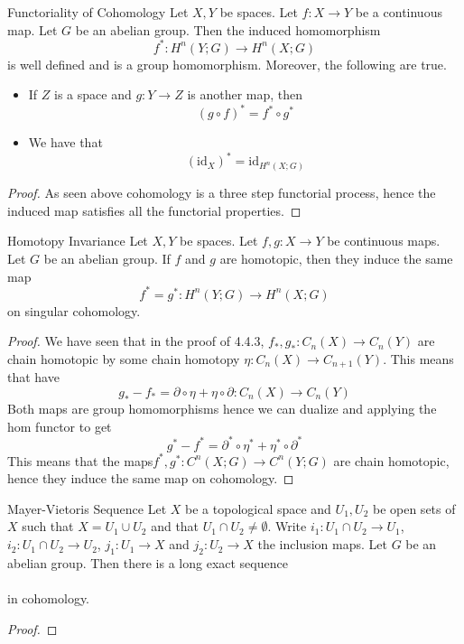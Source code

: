 \documentclass[a4paper]{article}
\begin{document}
\begin{thm}{Functoriality of Cohomology}{} Let $X,Y$ be spaces. Let $f:X\to Y$ be a continuous map. Let $G$ be an abelian group. Then the induced homomorphism $$f^\ast:H^n(Y;G)\to H^n(X;G)$$ is well defined and is a group homomorphism. Moreover, the following are true. 
\begin{itemize}
\item If $Z$ is a space and $g:Y\to Z$ is another map, then $$(g\circ f)^\ast=f^\ast\circ g^\ast$$
\item We have that $$(\text{id}_X)^\ast=\text{id}_{H^n(X;G)}$$
\end{itemize} 
\begin{proof}
As seen above cohomology is a three step functorial process, hence the induced map satisfies all the functorial properties. 
\end{proof}
\end{thm}

\begin{thm}{Homotopy Invariance}{} Let $X,Y$ be spaces. Let $f,g:X\to Y$ be continuous maps. Let $G$ be an abelian group. If $f$ and $g$ are homotopic, then they induce the same map $$f^\ast=g^\ast:H^n(Y;G)\to H^n(X;G)$$ on singular cohomology. 
\begin{proof}
We have seen that in the proof of 4.4.3, $f_\ast,g_\ast:C_n(X)\to C_n(Y)$ are chain homotopic by some chain homotopy $\eta:C_n(X)\to C_{n+1}(Y)$. This means that have $$g_\ast-f_\ast=\partial\circ\eta+\eta\circ\partial:C_n(X)\to C_n(Y)$$ Both maps are group homomorphisms hence we can dualize and applying the hom functor to get $$g^\ast-f^\ast=\partial^\ast\circ\eta^\ast+\eta^\ast\circ\partial^\ast$$ This means that the maps$f^\ast,g^\ast:C^n(X;G)\to C^n(Y;G)$ are chain homotopic, hence they induce the same map on cohomology. 
\end{proof}
\end{thm}

\begin{thm}{Mayer-Vietoris Sequence}{} Let $X$ be a topological space and $U_1,U_2$ be open sets of $X$ such that $X=U_1\cup U_2$ and that $U_1\cap U_2\neq\emptyset$. Write $i_1:U_1\cap U_2\to U_1$, $i_2:U_1\cap U_2\to U_2$, $j_1:U_1\to X$ and $j_2:U_2\to X$ the inclusion maps. Let $G$ be an abelian group. Then there is a long exact sequence \\
\\
in cohomology. 
\begin{proof}

\end{proof}
\end{thm}
\end{document}
